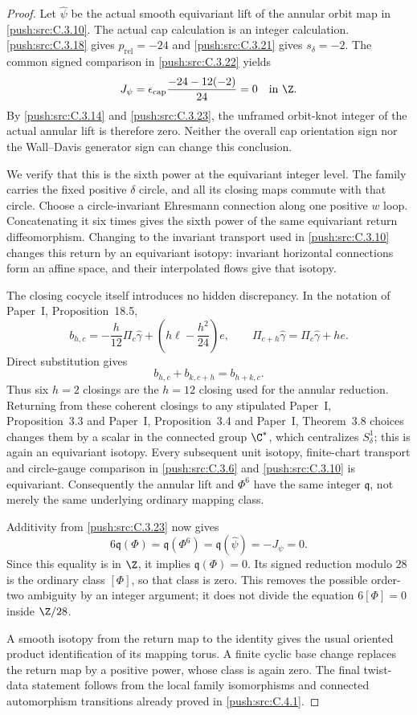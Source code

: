\begin{proof}
Let $\widehat\psi$ be the actual smooth equivariant lift of
the annular orbit map in \ref{push:src:C.3.10}.
The actual cap calculation is an integer calculation.
\ref{push:src:C.3.18} gives $p_{\mathrm{rel}}=-24$ and \ref{push:src:C.3.21} gives
$s_\delta=-2$. The common signed comparison in \ref{push:src:C.3.22} yields
\[
 J_\psi=\epsilon_{\rm cap}
          \frac{-24-12(-2)}{24}=0\quad\hbox{in }\Z.
\]
By \ref{push:src:C.3.14} and \ref{push:src:C.3.23}, the unframed orbit-knot integer of the
actual annular lift is therefore zero. Neither the overall cap
orientation sign nor the Wall--Davis generator sign can change
this conclusion.

We verify that this is the sixth power at the equivariant
integer level. The family carries the fixed positive
$\delta$ circle, and all its closing maps commute with that
circle. Choose a circle-invariant Ehresmann connection along
one positive $w$ loop. Concatenating it six times gives the
sixth power of the same equivariant return diffeomorphism.
Changing to the invariant transport used in \ref{push:src:C.3.10} changes
this return by an equivariant isotopy: invariant horizontal
connections form an affine space, and their interpolated
flows give that isotopy.

The closing cocycle itself introduces no hidden discrepancy.
In the notation of Paper~I, Proposition~18.5,
\[
 b_{h,c}=-\frac{h}{12}\Pi_c\widehat\gamma
             +\left(h\ell-\frac{h^2}{24}\right)e,
 \qquad \Pi_{c+h}\widehat\gamma
                   =\Pi_c\widehat\gamma+h e.
\]
Direct substitution gives
\[
 b_{h,c}+b_{k,c+h}=b_{h+k,c}.
\]
Thus six $h=2$ closings are the $h=12$ closing used for the
annular reduction. Returning from these coherent closings to
any stipulated Paper~I, Proposition~3.3 and Paper~I, Proposition~3.4 and Paper~I, Theorem~3.8 choices changes them by a scalar in the
connected group $\C^*$, which centralizes $S^1_\delta$;
this is again an equivariant isotopy. Every subsequent unit isotopy, finite-chart
transport and circle-gauge comparison in \ref{push:src:C.3.6} and \ref{push:src:C.3.10} is
equivariant. Consequently the annular lift and $\Phi^6$ have
the same integer $\mathfrak q$, not merely the same underlying
ordinary mapping class.

Additivity from \ref{push:src:C.3.23} now gives
\[
 6\mathfrak q(\Phi)=\mathfrak q(\Phi^6)
                   =\mathfrak q(\widehat\psi)=-J_\psi=0.
\]
Since this equality is in $\Z$, it implies
$\mathfrak q(\Phi)=0$. Its signed reduction modulo $28$
is the ordinary class $[\Phi]$, so that class is zero.
This removes the possible order-two ambiguity by an integer
argument; it does not divide the equation $6[\Phi]=0$ inside
$\Z/28$.

A smooth isotopy from the return map to the identity gives
the usual oriented product identification of its mapping
torus. A finite cyclic base change replaces the return map
by a positive power, whose class is again zero. The final
twist-data statement follows from the local family isomorphisms
and connected automorphism transitions already proved in \ref{push:src:C.4.1}.
\end{proof}

